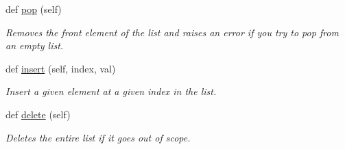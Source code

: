 \begin{DoxyCompactItemize}
def \hyperlink{class_singly_linked_list_1_1_singly_linked_list_a8ce39ad9c69786d36b9c25e0bf4efe4d}{pop} (self)
\begin{DoxyCompactList}\small\item\em Removes the front element of the list and raises an error if you try to pop from an empty list. \end{DoxyCompactList}\item 
def \hyperlink{class_singly_linked_list_1_1_singly_linked_list_a9b220c861a6a494377b660e7d8939fd6}{insert} (self, index, val)
\begin{DoxyCompactList}\small\item\em Insert a given element at a given index in the list. \end{DoxyCompactList}\item 
def \hyperlink{class_singly_linked_list_1_1_singly_linked_list_abdf6af051078edb7113bda7446188175}{delete} (self)
\begin{DoxyCompactList}\small\item\em Deletes the entire list if it goes out of scope. \end{DoxyCompactList}\end{DoxyCompactItemize}
